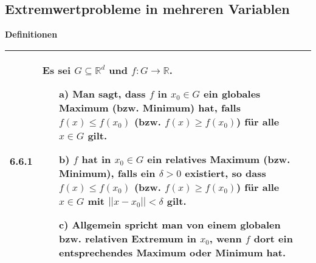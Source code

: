 \pagebreak

\subsection{Extremwertprobleme in mehreren Variablen}

    \noindent
    \textbf{Definitionen}
    \begin{table}[H]  
    \begin{tabularx}{\textwidth}{X m{16cm}}
        \toprule

        6.6.1 & Es sei $G \subseteq \mathbb{R}^d$ und $f: G \rightarrow \mathbb{R}$.
                \begin{itemize}[topsep=-0.5cm]
                    \item[a)] Man sagt, dass $f$ in $x_0 \in G$ ein globales Maximum (bzw. Minimum) hat, falls  $f(x) \leq f(x_0)$
                                (bzw. $f(x) \geq f(x_0)$) für alle $x \in G$ gilt.
                    \item[b)] $f$ hat in $x_0 \in G$ ein relatives Maximum (bzw. Minimum), falls ein $\delta > 0$ existiert, so dass
                                $f(x) \leq f(x_0)$ (bzw. $f(x) \geq f(x_0)$) für alle $x \in G$ mit $||x-x_0|| < \delta$ gilt.
                    \item[c)] Allgemein spricht man von einem globalen bzw. relativen Extremum in $x_0$, wenn $f$ dort ein entsprechendes
                                Maximum oder Minimum hat.  
                \end{itemize} \vspace{-0cm} \\ 

        \bottomrule

    \end{tabularx}
    \end{table}

